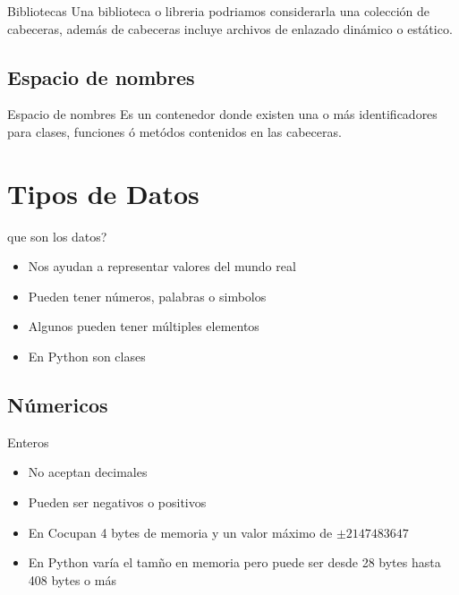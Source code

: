 \documentclass{beamer}
\newcommand{\Rplus}{\protect\hspace{-.1em}\protect\raisebox{.35ex}{\smaller{\smaller\textbf{+}}}}
\newcommand{\Cpp}{\mbox{C\Rplus\Rplus}\hspace{3pt}}
\begin{document}
	\begin{frame}{Bibliotecas}
		Una biblioteca o libreria podriamos considerarla una colecci\'on de cabeceras, adem\'as de cabeceras incluye archivos de enlazado din\'amico o est\'atico.
	\end{frame}
	
	\subsection{Espacio de nombres}
	
	\begin{frame}{Espacio de nombres}
		Es un contenedor donde existen una o m\'as identificadores para clases, funciones \'o met\'odos contenidos en las cabeceras.
	\end{frame}
	
	
	\section{Tipos de Datos}
	
	\begin{frame}{\textquestiondown que son los datos?}
		\begin{itemize}
			\item Nos ayudan a representar valores del mundo real
			\item Pueden tener n\'umeros, palabras o simbolos
			\item Algunos pueden tener m\'ultiples elementos 
			\item En Python son clases
		\end{itemize}
	\end{frame}
	
	\subsection{N\'umericos}
	
	\begin{frame}{Enteros}
		\begin{itemize}
			\item No aceptan decimales
			\item Pueden ser negativos o positivos
			\item En \Cpp ocupan 4 bytes de memoria y un valor m\'aximo de $\pm 2147483647$ 
			\item En Python var\'ia el tamño en memoria pero puede ser desde 28 bytes hasta 408 bytes o m\'as
		\end{itemize}
	\end{frame}
	
\end{document}
